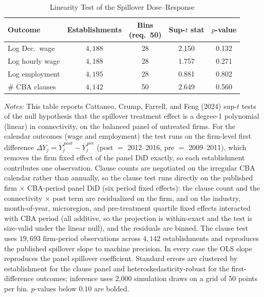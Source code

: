 \begin{table}[H]
\centering
\caption{Linearity Test of the Spillover Dose--Response}
\label{tab:linearity_did_fd}
\scriptsize
\begin{tabular}{lcccc}
\toprule\toprule
Outcome & Establishments & \shortstack{Bins\\(req.\ 50)} & \shortstack{Sup-$t$\\stat} & $p$-value \\
\midrule
Log Dec.\ wage & $4{,}188$ & 28 & 2.150 & 0.132 \\
Log hourly wage & $4{,}188$ & 28 & 1.757 & 0.271 \\
Log employment & $4{,}195$ & 28 & 0.881 & 0.802 \\
\# CBA clauses & $4{,}142$ & 50 & 2.649 & 0.560 \\
\bottomrule
\end{tabular}
\begin{minipage}{\linewidth}
\footnotesize\vspace{4pt}
\textit{Notes:} This table reports Cattaneo, Crump, Farrell, and Feng (2024) sup-$t$ tests of the null hypothesis that the spillover treatment effect is a degree-1 polynomial (linear) in connectivity, on the balanced panel of untreated firms. For the calendar outcomes (wage and employment) the test runs on the firm-level first difference $\Delta Y_j = \overline{Y}_j^{\,post} - \overline{Y}_j^{\,pre}$ (post $=$ 2012--2016, pre $=$ 2009--2011), which removes the firm fixed effect of the panel DiD exactly, so each establishment contributes one observation. Clause counts are negotiated on the irregular CBA calendar rather than annually, so the clause test runs directly on the published firm $\times$ CBA-period panel DiD (six period fixed effects): the clause count and the connectivity $\times$ post term are residualized on the firm, and on the industry, month-of-year, microregion, and pre-treatment quartile fixed effects interacted with CBA period (all additive, so the projection is within-exact and the test is size-valid under the linear null), and the residuals are binned. The clause test uses $19{,}693$ firm-period observations across $4{,}142$ establishments and reproduces the published spillover slope to machine precision. In every case the OLS slope reproduces the panel spillover coefficient. Standard errors are clustered by establishment for the clause panel and heteroskedasticity-robust for the first-difference outcomes; inference uses 2{,}000 simulation draws on a grid of 50 points per bin. $p$-values below $0.10$ are bolded.
\end{minipage}
\end{table}
